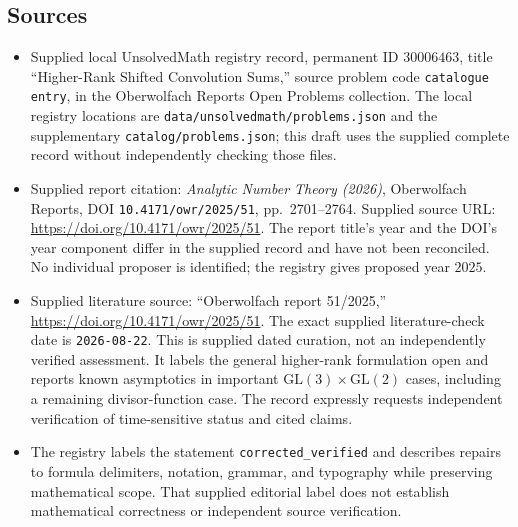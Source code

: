\documentclass[11pt]{article}
\begin{document}
\subsection{Sources}
\begin{itemize}
\item Supplied local UnsolvedMath registry record, permanent ID \(30006463\), title ``Higher-Rank Shifted Convolution Sums,'' source problem code \texttt{catalogue entry}, in the Oberwolfach Reports Open Problems collection. The local registry locations are \texttt{data/unsolvedmath/problems.json} and the supplementary \texttt{catalog/problems.json}; this draft uses the supplied complete record without independently checking those files.
\item Supplied report citation: \emph{Analytic Number Theory (2026)}, Oberwolfach Reports, DOI \texttt{10.4171/owr/2025/51}, pp.\ 2701--2764. Supplied source URL: \url{https://doi.org/10.4171/owr/2025/51}. The report title's year and the DOI's year component differ in the supplied record and have not been reconciled. No individual proposer is identified; the registry gives proposed year \(2025\).
\item Supplied literature source: ``Oberwolfach report 51/2025,'' \url{https://doi.org/10.4171/owr/2025/51}. The exact supplied literature-check date is \texttt{2026-08-22}. This is supplied dated curation, not an independently verified assessment. It labels the general higher-rank formulation open and reports known asymptotics in important \(\mathrm{GL}(3)\times\mathrm{GL}(2)\) cases, including a remaining divisor-function case. The record expressly requests independent verification of time-sensitive status and cited claims.
\item The registry labels the statement \texttt{corrected\_verified} and describes repairs to formula delimiters, notation, grammar, and typography while preserving mathematical scope. That supplied editorial label does not establish mathematical correctness or independent source verification.
\end{itemize}
\end{document}
